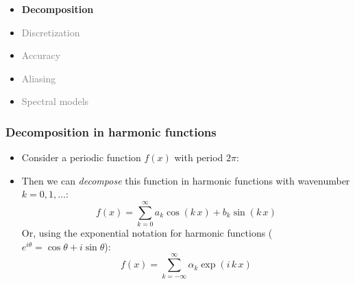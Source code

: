 \documentclass[aspectratio=149,9pt]{beamer}
\begin{document}
%
%
\begin{frame}
	\begin{itemize}
		\item {\bfseries Decomposition}
		\item \textcolor{gray}{Discretization}
		\item \textcolor{gray}{Accuracy}
		\item \textcolor{gray}{Aliasing}
		\item \textcolor{gray}{Spectral models}
	\end{itemize}
\end{frame}
%
%
\begin{frame}
	\frametitle{Decomposition in harmonic functions}
	\vfill\begin{itemize}
		\item Consider a periodic function $f(x)$ with period $2\pi$:
			\begin{center}
				\scalebox{.6}{\small
				}
			\end{center}\vfill
		\item Then we can \emph{decompose} this function in harmonic functions with wavenumber $k=0,1,\ldots$:
			\begin{equation*}
				f(x)=\sum_{k=0}^{\infty} a_k\cos(k\, x) + b_k\sin(k\, x)
			\end{equation*}\vspace*{-3mm}
			Or, using the exponential notation for harmonic functions ($e^{i\theta}=\cos\theta+i\sin\theta$):
			\begin{equation*}
				f(x)=\sum_{k=-\infty}^{\infty} \alpha_k \exp(i\,k\,x)
			\end{equation*}
	\end{itemize}\vfill
\end{frame}
%
%
\end{document}
